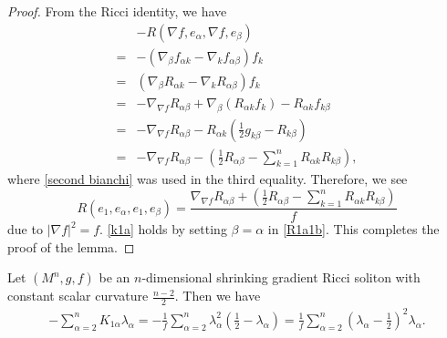 \documentclass[12pt]{amsart}
\newcommand{\ban}{\begin{eqnarray*}}
\newcommand{\ean}{\end{eqnarray*}}
\begin{document}
	\begin{proof}
		From the Ricci identity, we have
		\begin{equation*}
		\begin{aligned}
		&-R(\nabla f, e_\alpha, \nabla f, e_\beta) \\
		=&-\left( \nabla_\beta f_{\alpha k} - \nabla_kf_{\alpha \beta}\right) f_{k}\\
		=&\left( \nabla_\beta R_{\alpha k} - \nabla_kR_{\alpha \beta}\right) f_{k}\\
		=&-  \nabla_{\nabla f} R_{\alpha \beta}+\nabla_{\beta}(R_{\alpha k} f_k)- R_{\alpha k}f_{ k\beta}\\
		=&-  \nabla_{\nabla f} R_{\alpha \beta}- R_{\alpha k}\left( \frac{1}{2}g_{ k\beta}-R_{ k\beta} \right) \\
		=&- \nabla_{\nabla f} R_{\alpha \beta}-\left( \frac{1}{2}R_{\alpha \beta}-\sum_{k=1}^nR_{\alpha k}R_{k\beta}\right),
		\end{aligned}
		\end{equation*}
		where \eqref{second bianchi} was used in the third equality. Therefore, we see
		\begin{equation}\label{R1a1b}
		R(e_1, e_\alpha, e_1, e_\beta)=\frac{ \nabla_{\nabla f} R_{\alpha \beta}+\left( \frac{1}{2}R_{\alpha \beta}-\sum_{k=1}^n R_{\alpha k}R_{k\beta}\right) }{f}
		\end{equation}
		due to $|\nabla f|^2=f$. \eqref{k1a} holds by setting $\beta=\alpha$ in \eqref{R1a1b}.
		This completes the proof of the lemma.
	\end{proof}
	
	\begin{lem}\label{lek1a}
		Let $(M^n, g, f)$ be an  $n$-dimensional shrinking gradient Ricci soliton with constant scalar curvature $\frac{n-2}{2}$. Then we have
		\ban
		 -\sum_{\alpha=2}^nK_{1\alpha}\lambda_\alpha=-\frac{1}{f}\sum_{\alpha=2}^n\lambda_\alpha^2(\frac{1}{2}-\lambda_\alpha)=\frac{1}{f}\sum_{\alpha=2}^n(\lambda_\alpha-\frac{1}{2})^2\lambda_\alpha.
		\ean
	\end{lem}
	
\end{document}
